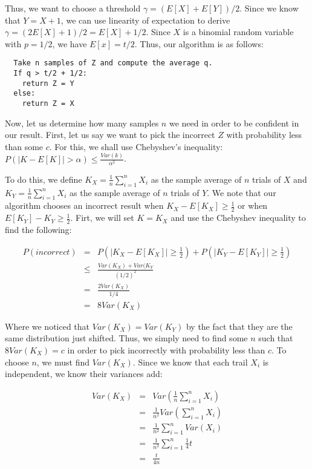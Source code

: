 \documentclass[psamsfonts]{amsart}
\begin{document}
Thus, we want to choose a threshold $\gamma = (E[X] + E[Y])/2$. Since we know that $Y = X + 1$, we can use linearity of expectation to derive $\gamma = (2E[X] + 1)/2 = E[X] + 1/2$. Since $X$ is a binomial random variable with $p = 1/2$, we have $E[x] = t/2$. Thus, our algorithm is as follows:

\begin{verbatim}
  Take n samples of Z and compute the average q.
  If q > t/2 + 1/2:
    return Z = Y
  else:
    return Z = X
\end{verbatim}

Now, let us determine how many samples $n$ we need in order to be confident in our result. First, let us say we want to pick the incorrect $Z$ with probability less than some $c$. For this, we shall use Chebyshev's inequality: $P(|K - E[K]| > \alpha) \leq \frac{Var(k)}{\alpha^2}$. 

To do this, we define $K_{X} = \frac{1}{n} \sum_{i=1}^n X_i$ as the sample average of $n$ trials of $X$ and $K_{Y} = \frac{1}{n} \sum_{i=1}^n X_i$ as the sample average of $n$ trials of $Y$. We note that our algorithm chooses an incorrect result when $K_{X} - E[K_{X}] \geq \frac{1}{2}$ or when $E[K_{Y}] - K_{Y} \geq \frac{1}{2}$. Firt, we will set $K = K_{X}$ and use the Chebyshev inequality to find the following:

\begin{eqnarray}
  P(incorrect) &=& P \left(|K_{X}-E[K_{X}]| \geq \frac{1}{2} \right) + P \left(|K_{Y} - E[K_{Y}]| \geq \frac{1}{2} \right) \\
               &\leq& \frac{Var(K_{X}) + Var(K_{Y}}{(1/2)^2} \\
               &=& \frac{2 Var(K_{X})}{1/4} \\
               &=& 8 Var(K_{X})
\end{eqnarray}

Where we noticed that $Var(K_{X}) = Var(K_{Y})$ by the fact that they are the same distribution just shifted. Thus, we simply need to find some $n$ such that $8 Var(K_{X}) = c$ in order to pick incorrectly with probability less than $c$. To choose $n$, we must find $Var(K_{X})$. Since we know that each trail $X_i$ is independent, we know their variances add:

\begin{eqnarray}
  Var(K_X) &=& Var\left( \frac{1}{n} \sum_{i=1}^n X_i \right) \\
          &=& \frac{1}{n^2} Var\left(\sum_{i=1}^n X_i \right) \\
          &=& \frac{1}{n^2} \sum_{i=1}^n Var(X_i) \\
          &=& \frac{1}{n^2} \sum_{i=1}^n \frac{1}{4}t \\
          &=& \frac{t}{4n}
\end{eqnarray}
\end{document}
